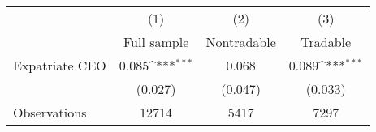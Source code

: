{
\def\sym#1{\ifmmode^{#1}\else\(^{#1}\)\fi}
\begin{tabular}{l*{3}{c}}
\hline\hline
                    &\multicolumn{1}{c}{(1)}&\multicolumn{1}{c}{(2)}&\multicolumn{1}{c}{(3)}\\
                    &\multicolumn{1}{c}{Full sample}&\multicolumn{1}{c}{Nontradable}&\multicolumn{1}{c}{Tradable}\\
\hline
Expatriate CEO      &       0.085\sym{***}&       0.068         &       0.089\sym{***}\\
                    &     (0.027)         &     (0.047)         &     (0.033)         \\
\hline
Observations        &       12714         &        5417         &        7297         \\
\hline\hline
\end{tabular}
}
